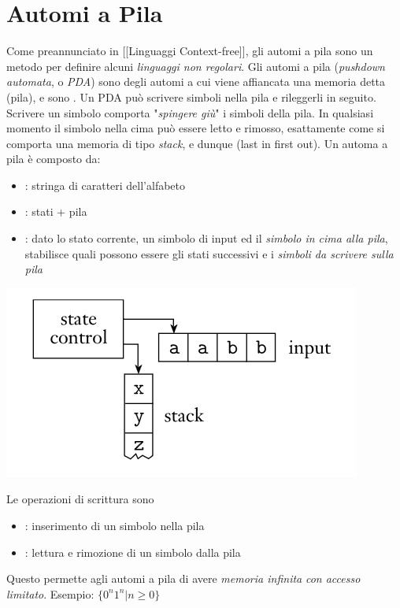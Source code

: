 \section{Automi a Pila}
Come preannunciato in [[Linguaggi Context-free]], gli automi a pila sono un metodo per definire alcuni \textit{linguaggi non regolari}.
Gli automi a pila (\textit{pushdown automata}, o \textit{PDA}) sono degli automi a cui viene affiancata una memoria detta 
 (pila), e sono . 
Un PDA può scrivere simboli nella pila e rileggerli in seguito. Scrivere un simbolo comporta "\textit{spingere giù}" i simboli della pila.
In qualsiasi momento il simbolo nella cima può essere letto e rimosso, esattamente come si comporta una memoria di tipo \textit{stack},
e dunque  (last in first out).
Un automa a pila è composto da: 
\begin{itemize}
	\item {}: stringa di caratteri dell'alfabeto
	\item {}: stati + pila
	\item {}: dato lo stato corrente, un simbolo di input ed il \textit{simbolo in cima alla pila},
		stabilisce quali possono essere gli stati successivi e i \textit{simboli da scrivere sulla pila}
\end{itemize}
\includegraphics[scale=0.5]{img/schema_PDA.png}

Le operazioni di scrittura sono 
\begin{itemize}
	\item {}: inserimento di un simbolo nella pila
	\item {}: lettura e rimozione di un simbolo dalla pila
\end{itemize}
Questo permette agli automi a pila di avere \textit{memoria infinita}  \textit{con accesso limitato}.
Esempio: $\{0^n1^n | n \geq 0\}$

